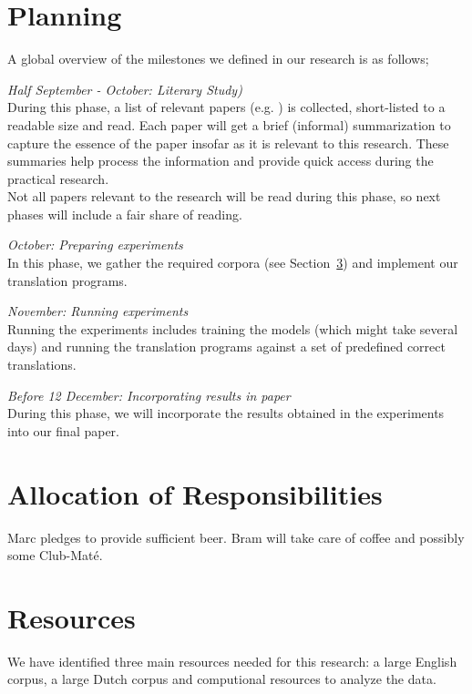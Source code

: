 \section{Planning}
A global overview of the milestones we defined in our research is as follows;
\begin{description}
  \item \emph{Half September - October: Literary Study)}\\
    During this phase, a list of relevant papers (e.g. \cite{levy2014linguistic, mikolov2013exploiting, wolf2014joint}) is collected, short-listed to a readable size and read. Each paper will get a brief (informal) summarization to capture the essence of the paper insofar as it is relevant to this research. These summaries help process the information and provide quick access during the practical research.\\

    Not all papers relevant to the research will be read during this phase, so next phases will include a fair share of reading.
  \item \emph{October: Preparing experiments}\\
    In this phase, we gather the required corpora (see Section~\ref{sec:resources}) and implement our translation programs.
  \item \emph{November: Running experiments}\\
    Running the experiments includes training the models (which might take several days) and running the translation programs against a set of predefined correct translations.
  \item \emph{Before 12 December: Incorporating results in paper}\\
    During this phase, we will incorporate the results obtained in the experiments into our final paper.
\end{description}

\section{Allocation of Responsibilities}
Marc pledges to provide sufficient beer. Bram will take care of coffee and possibly some Club-Maté.


\section{Resources}
\label{sec:resources}
We have identified three main resources needed for this research: a large English corpus, a large Dutch corpus and computional resources to analyze the data.

